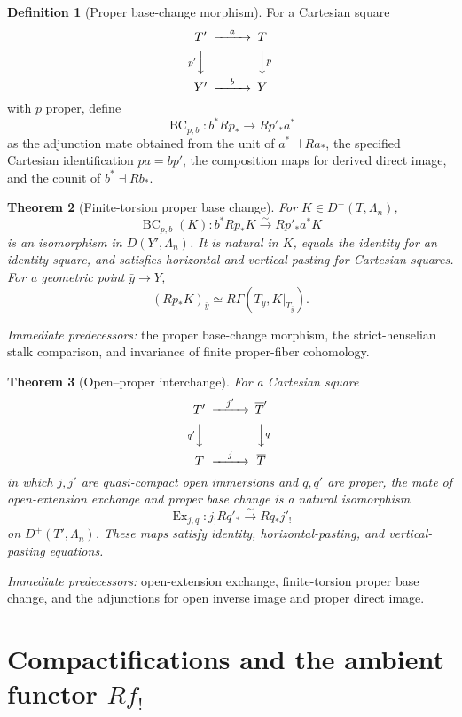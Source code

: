 \documentclass[10pt]{article}
\newtheorem{theorem}{Theorem}[section]
\theoremstyle{definition}
\newtheorem{definition}[theorem]{Definition}
\newcommand{\pred}[1]{\par\smallskip\begingroup\footnotesize\raggedright
\emph{Immediate predecessors:} #1.\par\endgroup}
\begin{document}
\begin{definition}[Proper base-change morphism]
For a Cartesian square
\[
\begin{CD}
 T'@>{a}>>T\\
 @V{p'}VV @VV{p}V\\
 Y'@>{b}>>Y
\end{CD}
\]
with \(p\) proper, define
\[
 \operatorname{BC}_{p,b}:b^*Rp_*\longrightarrow Rp'_*a^*
\]
as the adjunction mate obtained from the unit of \(a^*\dashv Ra_*\), the
specified Cartesian identification \(pa=bp'\), the composition maps for
derived direct image, and the counit of \(b^*\dashv Rb_*\).
\end{definition}

\begin{theorem}[Finite-torsion proper base change]
For \(K\in D^+(T,\Lambda_n)\),
\[
 \operatorname{BC}_{p,b}(K):
 b^*Rp_*K\xrightarrow{\sim}Rp'_*a^*K
\]
is an isomorphism in \(D(Y',\Lambda_n)\).  It is natural in \(K\), equals
the identity for an identity square, and satisfies horizontal and vertical
pasting for Cartesian squares.  For a geometric point \(\bar y\to Y\),
\[
 (Rp_*K)_{\bar y}\simeq
 R\Gamma(T_{\bar y},K|_{T_{\bar y}}).
\]
\end{theorem}
\pred{the proper base-change morphism, the strict-henselian stalk comparison, and invariance of finite proper-fiber cohomology}

\begin{theorem}[Open--proper interchange]
For a Cartesian square
\[
\begin{CD}
 T'@>{j'}>>\overline T'\\
 @V{q'}VV @VV{q}V\\
 T@>{j}>>\overline T
\end{CD}
\]
in which \(j,j'\) are quasi-compact open immersions and \(q,q'\) are
proper, the mate of open-extension exchange and proper base change is a
natural isomorphism
\[
 \operatorname{Ex}_{j,q}:j_!Rq'_*\xrightarrow{\sim}Rq_*j'_!
\]
on \(D^+(T',\Lambda_n)\).  These maps satisfy identity, horizontal-pasting,
and vertical-pasting equations.
\end{theorem}
\pred{open-extension exchange, finite-torsion proper base change, and the adjunctions for open inverse image and proper direct image}

\section{Compactifications and the ambient functor
\texorpdfstring{\(Rf_!\)}{Rf!}}
\end{document}
